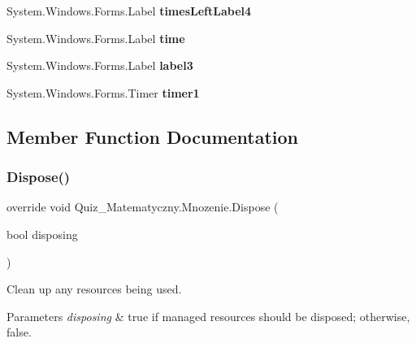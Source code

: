 \begin{DoxyCompactItemize}
\item 
\mbox{\label{class_quiz___matematyczny_1_1_mnozenie_a72bacc5ed9cc074e949f9c4d2e17ddbd}} 
System.\+Windows.\+Forms.\+Label {\bfseries times\+Left\+Label4}
\item 
\mbox{\label{class_quiz___matematyczny_1_1_mnozenie_a6b9883e0dc6b26ceb517381219946164}} 
System.\+Windows.\+Forms.\+Label {\bfseries time}
\item 
\mbox{\label{class_quiz___matematyczny_1_1_mnozenie_aaf87746fd1d85a167e0dfc0e8faa6726}} 
System.\+Windows.\+Forms.\+Label {\bfseries label3}
\item 
\mbox{\label{class_quiz___matematyczny_1_1_mnozenie_adbc645dd61ff116cfaaa2f5fa21fc99a}} 
System.\+Windows.\+Forms.\+Timer {\bfseries timer1}
\end{DoxyCompactItemize}


\subsection{Member Function Documentation}
\mbox{\label{class_quiz___matematyczny_1_1_mnozenie_afc8f3862f2f252837e5416cf2fb5a5c4}} 
\subsubsection{\texorpdfstring{Dispose()}{Dispose()}}
{\footnotesize\ttfamily override void Quiz\+\_\+\+Matematyczny.\+Mnozenie.\+Dispose (\begin{DoxyParamCaption}\item[{bool}]{disposing }\end{DoxyParamCaption})\hspace{0.3cm}{\ttfamily [protected]}}



Clean up any resources being used. 


\begin{DoxyParams}{Parameters}
{\em disposing} & true if managed resources should be disposed; otherwise, false.\\
\hline
\end{DoxyParams}
\mbox{\label{class_quiz___matematyczny_1_1_mnozenie_a8602d5da00d00467ccb971b345fce0a9}} 
